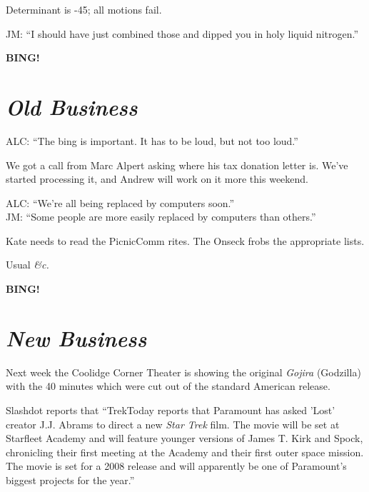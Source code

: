 \documentclass[10pt]{article}
\newcommand{\bing}{{\bf BING!} }
\newcommand{\goto}[1]{\bing \vskip 12pt \section*{{\em{#1}}}}
\begin{document}
Determinant is -45; all motions fail.

JM: ``I should have just combined those and dipped you in holy liquid nitrogen.''






\goto{Old Business}

ALC: ``The bing is important.  It has to be loud, but not too loud.''

We got a call from Marc Alpert asking where his tax donation letter is.  We've started processing 
it, and Andrew will work on it more this weekend.

ALC: ``We're all being replaced by computers soon.''\\
JM: ``Some people are more easily replaced by computers than others.''

Kate needs to read the PicnicComm rites.  The Onseck frobs the appropriate lists.

Usual \emph{\&c.}

\goto{New Business}

Next week the Coolidge Corner Theater is showing the original \emph{Gojira} (Godzilla) with the 40
minutes which were cut out of the standard American release.

Slashdot reports that ``TrekToday reports that Paramount has asked 'Lost' creator J.J. Abrams to 
direct a new \emph{Star Trek} film. The movie will be set at Starfleet Academy and will feature 
younger versions of James T. Kirk and Spock, chronicling their first meeting at the Academy and 
their first outer space mission. The movie is set for a 2008 release and will apparently be one of 
Paramount's biggest projects for the year.''
\end{document}
